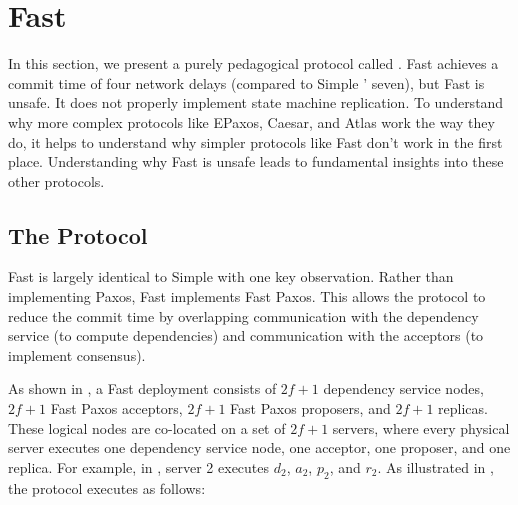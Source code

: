 \section{Fast \BPaxos{}}
In this section, we present a purely pedagogical protocol called . Fast \BPaxos{} achieves a commit time of four network delays
(compared to Simple \BPaxos{}' seven), but Fast \BPaxos{} is unsafe. It does not
properly implement state machine replication. To understand why more complex
protocols like EPaxos, Caesar, and Atlas work the way they do, it helps to
understand why simpler protocols like Fast \BPaxos{} don't work in the first
place. Understanding why Fast \BPaxos{} is unsafe leads to fundamental insights
into these other protocols.

\subsection{The Protocol}
{}

Fast \BPaxos{} is largely identical to Simple \BPaxos{} with one key
observation. Rather than implementing Paxos, Fast \BPaxos{} implements Fast
Paxos. This allows the protocol to reduce the commit time by overlapping
communication with the dependency service (to compute dependencies) and
communication with the acceptors (to implement consensus).

As shown in , a Fast \BPaxos{} deployment consists of $2f+1$
dependency service nodes, $2f+1$ Fast Paxos acceptors, $2f+1$ Fast Paxos
proposers, and $2f+1$ replicas. These logical nodes are co-located on a set of
$2f+1$ servers, where every physical server executes one dependency service
node, one acceptor, one proposer, and one replica. For example, in
, server 2 executes $d_2$, $a_2$, $p_2$, and $r_2$. As
illustrated in , the protocol executes as follows:

